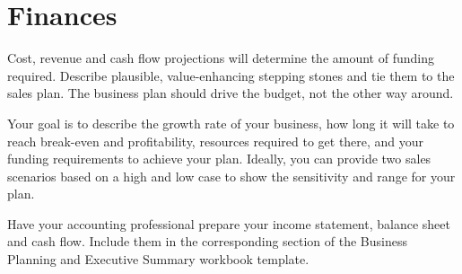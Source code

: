 \section{Finances}

Cost, revenue and cash flow projections will determine the amount of funding
required. Describe plausible, value-enhancing stepping stones and tie them to the
sales plan. The business plan should drive the budget, not the other way around.

Your goal is to describe the growth rate of your business, how long it will take to
reach break-even and profitability, resources required to get there, and your funding
requirements to achieve your plan. Ideally, you can provide two sales scenarios
based on a high and low case to show the sensitivity and range for your plan.

Have your accounting professional prepare your income statement,
balance sheet and cash flow. Include them in the corresponding
section of the Business Planning and Executive Summary workbook
template.